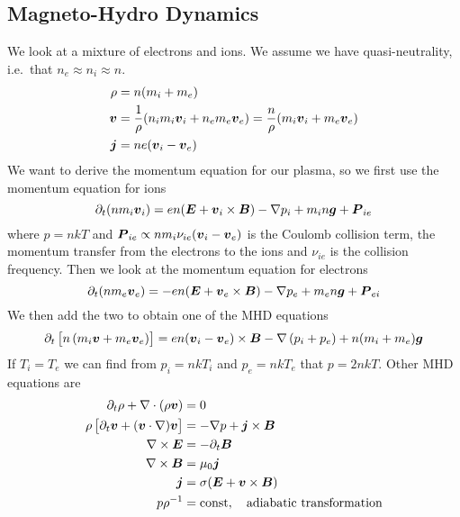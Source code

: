 \subsection{Magneto-Hydro Dynamics}
We look at a mixture of electrons and ions. We assume we have quasi-neutrality, i.e.\ that \(n_e\approx n_i\approx n\).
\begin{align*}
    \rho&=n(m_i+m_e)\\
    \boldsymbol{v}&=\frac{1}{\rho}(n_{i}m_i\boldsymbol{v}_i+n_{e}m_e\boldsymbol{v}_e)=\frac{n}{\rho}(m_i\boldsymbol{v}_i+m_e\boldsymbol{v}_e)\\
    \boldsymbol{j}&=ne(\boldsymbol{v}_i-\boldsymbol{v}_e)
\end{align*}
We want to derive the momentum equation for our plasma, so we first use the momentum equation for ions
\begin{equation*}
    \partial_{t}(nm_i\boldsymbol{v}_i)=en(\boldsymbol{E}+\boldsymbol{v}_i\times\boldsymbol{B})-\nabla p_i+m_{i}n\boldsymbol{g}+\boldsymbol{P}_{ie}
\end{equation*}
where \(p=nkT\) and \(\boldsymbol{P}_{ie}\propto nm_i\nu_{ie}(\boldsymbol{v}_i-\boldsymbol{v}_e)\) is the Coulomb collision term, the momentum transfer from the electrons to the ions and \(\nu_{ie}\) is the collision frequency. Then we look at the momentum equation for electrons
\begin{equation*}
    \partial_{t}(nm_e\boldsymbol{v}_e)=-en(\boldsymbol{E}+\boldsymbol{v}_e\times\boldsymbol{B})-\nabla p_e+m_{e}n\boldsymbol{g}+\boldsymbol{P}_{ei}
\end{equation*}
We then add the two to obtain one of the MHD equations
\begin{equation*}
    \partial_{t}\left[n\left(m_i\boldsymbol{v}+m_e\boldsymbol{v}_e\right)\right]=en(\boldsymbol{v}_i-\boldsymbol{v}_e)\times\boldsymbol{B}-\nabla\left(p_i+p_e\right)+n(m_i+m_e)\boldsymbol{g}
\end{equation*}
If \(T_i=T_e\) we can find from \(p_i=nkT_i\) and \(p_e=nkT_e\) that \(p=2nkT\).
Other MHD equations are
\begin{align}
    \partial_{t}\rho+\nabla\cdot\left(\rho \boldsymbol{v}\right)&=0\label{eq:MHD_1}\\
    \rho\left[\partial_{t}\boldsymbol{v}+(\boldsymbol{v}\cdot\nabla)\boldsymbol{v}\right]&=-\nabla p+\boldsymbol{j}\times\boldsymbol{B}\label{eq:MHD_2}\\
    \nabla\times\boldsymbol{E}&=-\partial_{t}\boldsymbol{B}\label{eq:MHD_3}\\
    \nabla\times\boldsymbol{B}&=\mu_0\boldsymbol{j}\label{eq:MHD_4}\\
    \boldsymbol{j}&=\sigma(\boldsymbol{E}+\boldsymbol{v}\times\boldsymbol{B})\label{eq:MHD_5}\\
    p\rho^{-1}&=\text{const},\quad \textnormal{adiabatic transformation}\label{eq:MHD_6}
\end{align}
